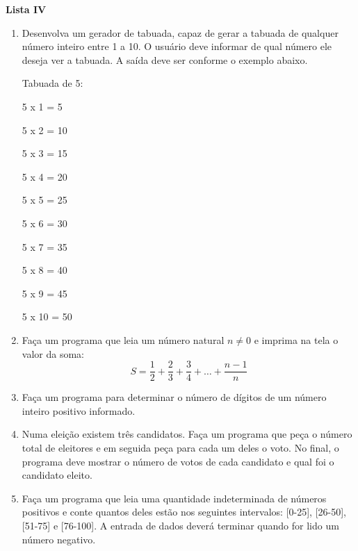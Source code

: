 \documentclass[12pt,a4paper]{article}
\begin{document}
\begin{center}
  \textbf{Lista IV}
\end{center}

\begin{enumerate}
  \item Desenvolva um gerador de tabuada, capaz de gerar a tabuada de qualquer número inteiro
  entre 1 a 10. O usuário deve informar de qual número ele deseja ver a tabuada. A saída deve
  ser conforme o exemplo abaixo.

    \vspace{0.5cm}
    Tabuada de 5:
    
    5 x 1 = 5
    
    5 x 2 = 10
    
    5 x 3 = 15
    
    5 x 4 = 20
    
    5 x 5 = 25

    5 x 6 = 30
    
    5 x 7 = 35
    
    5 x 8 = 40
    
    5 x 9 = 45
        
    5 x 10 = 50
    
    \vspace{0.5cm}


  \item Faça um programa que leia um número natural $n \neq 0$ e imprima na tela o valor da soma:
  $$S = \frac{1}{2} + \frac{2}{3} + \frac{3}{4} + \ldots + \frac{n - 1}{n}$$
    
  \item Faça um programa para determinar o número de dígitos de um número
   inteiro positivo informado.
  
  \item Numa eleição existem três candidatos. Faça um programa que peça o número total de eleitores
  e em seguida peça para cada um deles o voto. No final, o programa deve mostrar o número de votos
  de cada candidato e qual foi o candidato eleito.
  
  \item Faça um programa que leia uma quantidade indeterminada de números positivos e conte
  quantos deles estão nos seguintes intervalos: [0-25], [26-50], [51-75] e [76-100].
  A entrada de dados deverá terminar quando for lido um número negativo.   

\end{enumerate}
\end{document}
